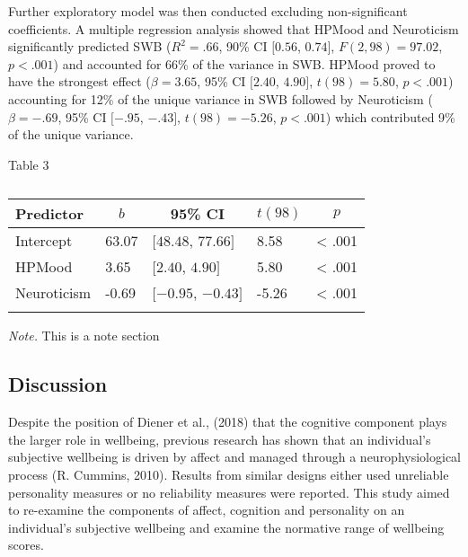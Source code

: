 \documentclass[man,floatsintext]{apa6}
\theoremstyle{definition}
\theoremstyle{definition}
\theoremstyle{definition}
\theoremstyle{remark}
\begin{document}
Further exploratory model was then conducted excluding non-significant
coefficients. A multiple regression analysis showed that HPMood and
Neuroticism significantly predicted SWB (\(R^2 = .66\), 90\% CI
\([0.56\), \(0.74]\), \(F(2, 98) = 97.02\), \(p < .001\)) and accounted
for 66\% of the variance in SWB. HPMood proved to have the strongest
effect (\(\beta = 3.65\), 95\% CI \([2.40\), \(4.90]\),
\(t(98) = 5.80\), \(p < .001\)) accounting for 12\% of the unique
variance in SWB followed by Neuroticism (\(\beta = -.69\), 95\% CI
\([-.95\), \(-.43]\), \(t(98) = -5.26\), \(p < .001\)) which contributed
9\% of the unique variance.

Table 3

\begin{table}[tbp]
\begin{center}
\begin{threeparttable}
\caption{\label{tab:unnamed-chunk-3}}
\small{
\begin{tabular}{lllll}
\toprule
Predictor & \multicolumn{1}{c}{$b$} & \multicolumn{1}{c}{95\% CI} & \multicolumn{1}{c}{$t(98)$} & \multicolumn{1}{c}{$p$}\\
\midrule
Intercept & 63.07 & $[48.48$, $77.66]$ & 8.58 & < .001\\
HPMood & 3.65 & $[2.40$, $4.90]$ & 5.80 & < .001\\
Neuroticism & -0.69 & $[-0.95$, $-0.43]$ & -5.26 & < .001\\
\bottomrule
\addlinespace
\end{tabular}
}
\begin{tablenotes}[para]
\normalsize{\textit{Note.} This is a note section}
\end{tablenotes}
\end{threeparttable}
\end{center}
\end{table}

\subsection{Discussion}\label{discussion}

Despite the position of Diener et al., (2018) that the cognitive
component plays the larger role in wellbeing, previous research has
shown that an individual's subjective wellbeing is driven by affect and
managed through a neurophysiological process (R. Cummins, 2010). Results
from similar designs either used unreliable personality measures or no
reliability measures were reported. This study aimed to re-examine the
components of affect, cognition and personality on an individual's
subjective wellbeing and examine the normative range of wellbeing
scores.
\end{document}
